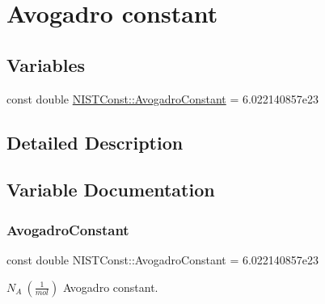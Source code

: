 \hypertarget{group___n_i_s_t_const-_avogadro_constant}{}\section{Avogadro constant}
\label{group___n_i_s_t_const-_avogadro_constant}
\subsection*{Variables}
\begin{DoxyCompactItemize}
\item 
const double \hyperlink{group___n_i_s_t_const-_avogadro_constant_gad82b2a4777628c4e67a87b8f5b99174e}{N\+I\+S\+T\+Const\+::\+Avogadro\+Constant} = 6.\+022140857e23
\end{DoxyCompactItemize}


\subsection{Detailed Description}


\subsection{Variable Documentation}
\mbox{\label{group___n_i_s_t_const-_avogadro_constant_gad82b2a4777628c4e67a87b8f5b99174e}} 
\subsubsection{\texorpdfstring{Avogadro\+Constant}{AvogadroConstant}}
{\footnotesize\ttfamily const double N\+I\+S\+T\+Const\+::\+Avogadro\+Constant = 6.\+022140857e23}

$N_A \ (\frac{1}{mol})$ Avogadro constant. 